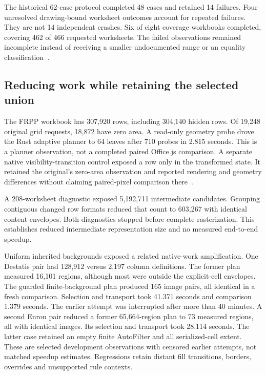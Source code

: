 The historical 62-case protocol completed 48 cases and retained 14 failures.
Four unresolved drawing-bound worksheet outcomes account for repeated failures.
They are not 14 independent crashes. Six of eight coverage workbooks completed,
covering 462 of 466 requested worksheets. The failed observations remained
incomplete instead of receiving a smaller undocumented range or an equality
classification~\cite{capturedecisiondevelopment}.

\subsection{Reducing work while retaining the selected union}
The FRPP workbook has 307,920 rows, including 304,140 hidden rows. Of 19,248
original grid requests, 18,872 have zero area. A read-only geometry probe drove
the Rust adaptive planner to 64 leaves after 710 probes in 2.815 seconds.
This is a planner observation, not a completed paired Office.js comparison.
A separate native visibility-transition control exposed a row only in the
transformed state. It retained the original's zero-area observation and reported
rendering and geometry differences without claiming paired-pixel comparison
there~\cite{adaptivedevelopment}.

A 208-worksheet diagnostic exposed 5,192,711 intermediate candidates. Grouping
contiguous changed row formats reduced that count to 603,267 with identical
content envelopes. Both diagnostics stopped before complete rasterization.
This establishes reduced intermediate representation size and no measured
end-to-end speedup.

Uniform inherited backgrounds exposed a related native-work amplification.
One Destatis pair had 128,912 versus 2,197 column definitions. The former plan
measured 16,101 regions, although most were outside the explicit-cell envelopes.
The guarded finite-background plan produced 165 image pairs, all identical in a
fresh comparison. Selection and transport took 41.371 seconds and comparison
1.379 seconds. The earlier attempt was interrupted after more than 40 minutes.
A second Enron pair reduced a former 65,664-region plan to 73 measured regions,
all with identical images. Its selection and transport took 28.114 seconds.
The latter case retained an empty finite AutoFilter and all serialized-cell
extent. These are selected development observations with censored earlier
attempts, not matched speedup estimates. Regressions retain distant fill
transitions, borders, overrides and unsupported rule contexts.

